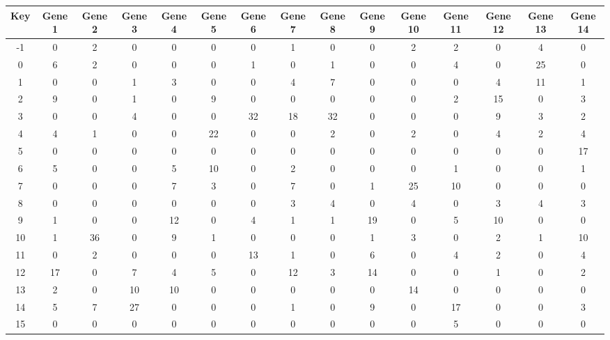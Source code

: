 \begin{tabular}{|c|c|c|c|c|c|c|c|c|c|c|c|c|c|c|}
\hline
Key & Gene 1 & Gene 2 & Gene 3 & Gene 4 & Gene 5 & Gene 6 & Gene 7 & Gene 8 & Gene 9 & Gene 10 & Gene 11 & Gene 12 & Gene 13 & Gene 14 \\
\hline
-1 & 0 & 2 & 0 & 0 & 0 & 0 & 1 & 0 & 0 & 2 & 2 & 0 & 4 & 0 \\
0 & 6 & 2 & 0 & 0 & 0 & 1 & 0 & 1 & 0 & 0 & 4 & 0 & 25 & 0 \\
1 & 0 & 0 & 1 & 3 & 0 & 0 & 4 & 7 & 0 & 0 & 0 & 4 & 11 & 1 \\
2 & 9 & 0 & 1 & 0 & 9 & 0 & 0 & 0 & 0 & 0 & 2 & 15 & 0 & 3 \\
3 & 0 & 0 & 4 & 0 & 0 & 32 & 18 & 32 & 0 & 0 & 0 & 9 & 3 & 2 \\
4 & 4 & 1 & 0 & 0 & 22 & 0 & 0 & 2 & 0 & 2 & 0 & 4 & 2 & 4 \\
5 & 0 & 0 & 0 & 0 & 0 & 0 & 0 & 0 & 0 & 0 & 0 & 0 & 0 & 17 \\
6 & 5 & 0 & 0 & 5 & 10 & 0 & 2 & 0 & 0 & 0 & 1 & 0 & 0 & 1 \\
7 & 0 & 0 & 0 & 7 & 3 & 0 & 7 & 0 & 1 & 25 & 10 & 0 & 0 & 0 \\
8 & 0 & 0 & 0 & 0 & 0 & 0 & 3 & 4 & 0 & 4 & 0 & 3 & 4 & 3 \\
9 & 1 & 0 & 0 & 12 & 0 & 4 & 1 & 1 & 19 & 0 & 5 & 10 & 0 & 0 \\
10 & 1 & 36 & 0 & 9 & 1 & 0 & 0 & 0 & 1 & 3 & 0 & 2 & 1 & 10 \\
11 & 0 & 2 & 0 & 0 & 0 & 13 & 1 & 0 & 6 & 0 & 4 & 2 & 0 & 4 \\
12 & 17 & 0 & 7 & 4 & 5 & 0 & 12 & 3 & 14 & 0 & 0 & 1 & 0 & 2 \\
13 & 2 & 0 & 10 & 10 & 0 & 0 & 0 & 0 & 0 & 14 & 0 & 0 & 0 & 0 \\
14 & 5 & 7 & 27 & 0 & 0 & 0 & 1 & 0 & 9 & 0 & 17 & 0 & 0 & 3 \\
15 & 0 & 0 & 0 & 0 & 0 & 0 & 0 & 0 & 0 & 0 & 5 & 0 & 0 & 0 \\
\hline
\end{tabular}